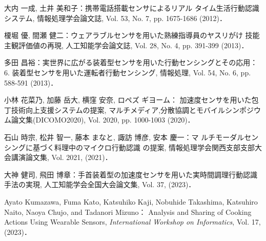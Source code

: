 \documentclass{jarticle}
\begin{document}





\begin{thebibliography}{9}
    大内 一成, 土井 美和子：携帯電話搭載センサによるリアル
    タイム生活行動認識システム, 情報処理学会論文誌, Vol. 53,
    No. 7, pp. 1675-1686 (2012)．
    
    榎堀 優, 間瀬 健二：ウェアラブルセンサを用いた熟練指導員のヤスリがけ
    技能主観評価値の再現, 人工知能学会論文誌, Vol. 28, No. 4, pp. 391-399 (2013)．
    
    多田 昌裕：実世界に広がる装着型センサを用いた行動センシングとその応用：6. 装着型センサを用いた運転者行動センシング, 情報処理, Vol. 54, No. 6, pp. 588-591 (2013)．
    
    小林 花菜乃, 加藤 岳大, 横窪 安奈, ロペズ ギヨーム：
    加速度センサを用いた包丁技術向上支援システムの提案, マルチメディア,分散協調とモバイルシンポジウム論文集(DICOMO2020), Vol. 2020, pp. 1000-1003 (2020)．
    
    石山 時宗, 松井 智一, 藤本 まなと, 諏訪 博彦, 安本 慶一：マ
    ルチモーダルセンシングに基づく料理中のマイクロ行動認識
    の提案, 情報処理学会関西支部支部大会講演論文集, Vol. 2021, (2021)．
    
    大神 健司, 飛田 博章：手首装着型の加速度センサを用いた実時間調理行動認識手法の実現,
     人工知能学会全国大会論文集, Vol. 37, (2023)．
    
    Ayato Kumazawa, Fuma Kato, Katsuhiko Kaji, Nobuhide Takashima, Katsuhiro Naito, Naoya Chujo, and Tadanori Mizuno：
    Analysis and Sharing of Cooking Actions Using Wearable Sensors, 
    \textit{International Workshop on Informatics}, Vol. 17, (2023)．
     

\end{thebibliography}
\end{document}
